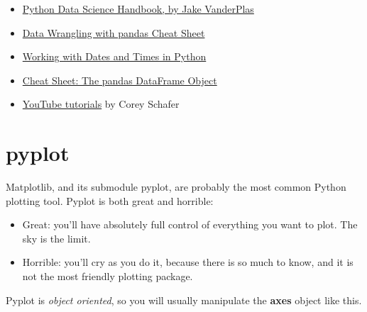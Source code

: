 \documentclass[
  letterpaper,
  DIV=11,
  numbers=noendperiod]{scrreprt}
\providecommand{\tightlist}{%
  \setlength{\itemsep}{0pt}\setlength{\parskip}{0pt}}\usepackage{longtable,booktabs,array}
\begin{document}
\begin{itemize}
\tightlist
\item
  \href{https://jakevdp.github.io/PythonDataScienceHandbook/index.html}{Python
  Data Science Handbook, by Jake VanderPlas}
\item
  \href{https://pandas.pydata.org/Pandas_Cheat_Sheet.pdf}{Data Wrangling
  with pandas Cheat Sheet}
\item
  \href{https://images.datacamp.com/image/upload/v1666944896/Marketing/Blog/Working_with_Dates_and_Times_Cheat_Sheet.pdf}{Working
  with Dates and Times in Python}
\item
  \href{https://www.webpages.uidaho.edu/~stevel/cheatsheets/Pandas\%20DataFrame\%20Notes_12pages.pdf}{Cheat
  Sheet: The pandas DataFrame Object}
\item
  \href{https://www.youtube.com/watch?v=ZyhVh-qRZPA&list=PL-osiE80TeTsWmV9i9c58mdDCSskIFdDS&pp=iAQB}{YouTube
  tutorials} by Corey Schafer
\end{itemize}

\section{pyplot}\label{pyplot}

Matplotlib, and its submodule pyplot, are probably the most common
Python plotting tool. Pyplot is both great and horrible:

\begin{itemize}
\tightlist
\item
  Great: you'll have absolutely full control of everything you want to
  plot. The sky is the limit.
\item
  Horrible: you'll cry as you do it, because there is so much to know,
  and it is not the most friendly plotting package.
\end{itemize}

Pyplot is \emph{object oriented}, so you will usually manipulate the
\textbf{axes} object like this.
\end{document}
